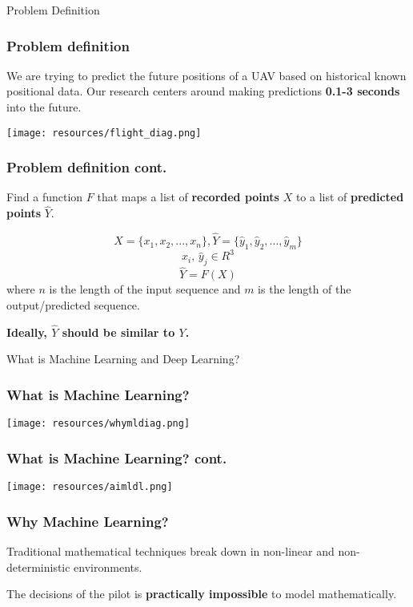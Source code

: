 \documentclass{beamer}
\begin{document}
\begin{frame}[standout]
    Problem Definition
\end{frame}

\begin{frame}
    \frametitle{Problem definition}

    We are trying to predict the future positions of a UAV based on historical
    known positional data. Our research centers around making predictions 
    \textbf{0.1-3 seconds} into the future.

    \centering
    \texttt{[image: resources/flight\_diag.png]}
\end{frame}


\begin{frame}
    \frametitle{Problem definition cont.}
    Find a function $F$ that maps a list of \textbf{recorded points} $X$ to a list 
    of \textbf{predicted points} $\hat{Y}$.

    $$ X = \{x_1, x_2, ..., x_n\}, \hat{Y} = \{\hat{y}_1, \hat{y}_2, ..., \hat{y}_m\} $$ 
    $$ x_i \text{, } \hat{y}_j \in R^3$$
    $$ \hat{Y} = F(X) $$
    where $n$ is the length of the input sequence and $m$ is the length of the 
    output/predicted sequence.

    \textbf{Ideally, $\hat{Y}$ should be similar to $Y$.}
\end{frame}

\begin{frame}[standout]
    What is Machine Learning and Deep Learning?
\end{frame}

\begin{frame}
    \frametitle{What is Machine Learning?}

    \centering
    \texttt{[image: resources/whymldiag.png]}
\end{frame}

\begin{frame}
    \frametitle{What is Machine Learning? cont.}

    \centering
    \texttt{[image: resources/aimldl.png]}
\end{frame}

\begin{frame}
    \frametitle{Why Machine Learning?}
    
    Traditional mathematical techniques break down in non-linear and 
    non-deterministic environments.

    The decisions of the pilot is \textbf{practically impossible} to model 
    mathematically.
\end{frame}
\end{document}
